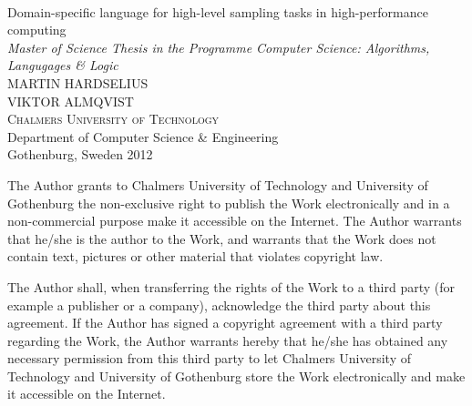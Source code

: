 \begin{titlepage}

\mbox{}
\vfill
\addtolength{\voffset}{2cm}
\begin{flushleft}
  {\\[0.2cm]
    {\huge Domain-specific language for high-level sampling
      tasks in high-performance computing}\\[.5cm]
    \emph{\Large Master of Science Thesis in the Programme Computer
      Science: Algorithms, Langugages \& Logic}\\[.8cm]
      
	
    {\huge MARTIN HARDSELIUS}\\[.8cm]
    {\huge VIKTOR ALMQVIST}\\[.8cm]
	
    {\textsc{Chalmers University of Technology}\\
      \Large Department of Computer Science \& Engineering \\
	Gothenburg, Sweden 2012 \\
    } 
  }
\end{flushleft}

\end{titlepage}
\ClearShipoutPicture

\pagestyle{empty}
\newpage
\clearpage
The Author grants to Chalmers University of Technology and University
of Gothenburg the non-exclusive right to publish the Work
electronically and in a non-commercial purpose make it accessible on
the Internet.  The Author warrants that he/she is the author to the
Work, and warrants that the Work does not contain text, pictures or
other material that violates copyright law.

The Author shall, when transferring the rights of the Work to a third
party (for example a publisher or a company), acknowledge the third
party about this agreement. If the Author has signed a copyright
agreement with a third party regarding the Work, the Author warrants
hereby that he/she has obtained any necessary permission from this
third party to let Chalmers University of Technology and University of
Gothenburg store the Work electronically and make it accessible on the
Internet.
\vfill


